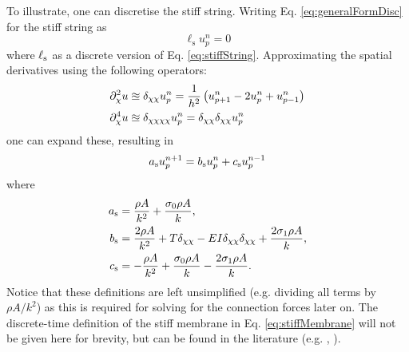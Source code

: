 \documentclass{article}
\begin{document}
To illustrate, one can discretise the stiff string. Writing Eq. \eqref{eq:generalFormDisc} for the stiff string as
\begin{equation}
    \ell_\text{s} u_p^n = 0
\end{equation}
where $\ell_{\text{s}}$ as a discrete version of Eq. \eqref{eq:stiffString}. Approximating the spatial derivatives using the following operators:
\begin{subequations}
\begin{align}
    \partial_{\chi}^2 u&\approxeq \delta_{\chi\chi} u_p^n = \frac{1}{h^2}\left(u_{p+1}^n - 2 u_p^n + u_{p-1}^n\right) \\
    \partial_{\chi}^4 u&\approxeq \delta_{\chi\chi\chi\chi} u_p^n = \delta_{\chi\chi}\delta_{\chi\chi} u_p^n
\end{align}
\end{subequations}
one can expand these, resulting in
\begin{equation}
    a_{\text{s}} u_p^{n+1} = b_{\text{s}} u_p^n + c_{\text{s}} u_p^{n-1}
\end{equation}
where
\begin{equation}
\begin{aligned}
a_{\text{s}} &= \frac{\rho A}{k^2} + \frac{\sigma_0 \rho A}{k},\\
b_{\text{s}} &= \frac{2\rho A}{k^2} + T\delta_{\chi\chi} - EI \delta_{\chi\chi}\delta_{\chi\chi} + \frac{2\sigma_1\rho A}{k},\\
c_{\text{s}} &= -\frac{\rho A}{k^2} +\frac{\sigma_0\rho A}{k} - \frac{2\sigma_1\rho A}{k}.
    \end{aligned}
\end{equation}
Notice that these definitions are left unsimplified (e.g. dividing all terms by $\rho A / k^2$) as this is required for solving for the connection forces later on. The discrete-time definition of the stiff membrane in Eq. \eqref{eq:stiffMembrane} will not be given here for brevity, but can be found in the literature (e.g. \cite{theBible}, \cite{WillemsenThesis}).
\end{document}
